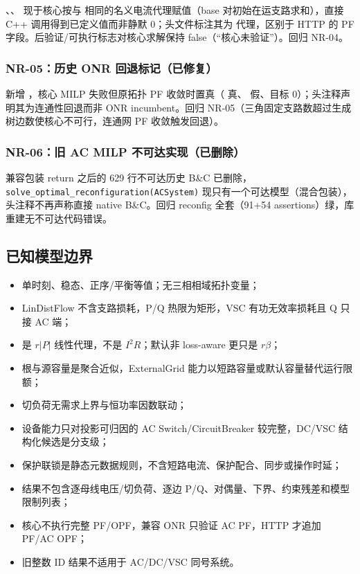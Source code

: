 、、 现于核心按与 
相同的名义电流代理赋值（base 对初始在运支路求和），直接 C++ 调用得到已定义值而非静默 0；头文件标注其为
代理，区别于 HTTP 的 PF 字段。后验证/可执行标志对核心求解保持 false（“核心未验证”）。回归
 NR-04。

\subsubsection{NR-05：历史 ONR 回退标记（已修复）}

新增 ，核心 MILP 失败但原拓扑 PF 收敛时置真（ 真、
 假、目标 0）；头注释声明其为连通性回退而非 ONR incumbent。回归 
NR-05（三角固定支路数超过生成树边数使核心不可行，连通网 PF 收敛触发回退）。

\subsubsection{NR-06：旧 AC MILP 不可达实现（已删除）}

 兼容包装 return 之后的 629 行不可达历史 B\&C 已删除，
\texttt{solve\_optimal\_reconfiguration(ACSystem)} 现只有一个可达模型（混合包装），头注释不再声称直接
native B\&C。回归 reconfig 全套（91+54 assertions）绿，库重建无不可达代码错误。

\subsection{已知模型边界}

\begin{itemize}
  \item 单时刻、稳态、正序/平衡等值；无三相相域拓扑变量；
  \item LinDistFlow 不含支路损耗，P/Q 热限为矩形，VSC 有功无效率损耗且 Q 只接 AC 端；
  \item {} 是 $r|P|$ 线性代理，不是 $I^2R$；默认非 loss-aware 更只是 $r\beta$；
  \item 根与源容量是聚合近似，ExternalGrid 能力以短路容量或默认容量替代运行限额；
  \item 切负荷无需求上界与恒功率因数联动；
  \item 设备能力只对投影可归因的 AC Switch/CircuitBreaker 较完整，DC/VSC 结构化候选是分支级；
  \item 保护联锁是静态元数据规则，不含短路电流、保护配合、同步或操作时延；
  \item 结果不包含逐母线电压/切负荷、逐边 P/Q、对偶量、下界、约束残差和模型限制列表；
  \item 核心不执行完整 PF/OPF，兼容 ONR 只验证 AC PF，HTTP 才追加 PF/AC OPF；
  \item 旧整数 ID 结果不适用于 AC/DC/VSC 同号系统。
\end{itemize}

